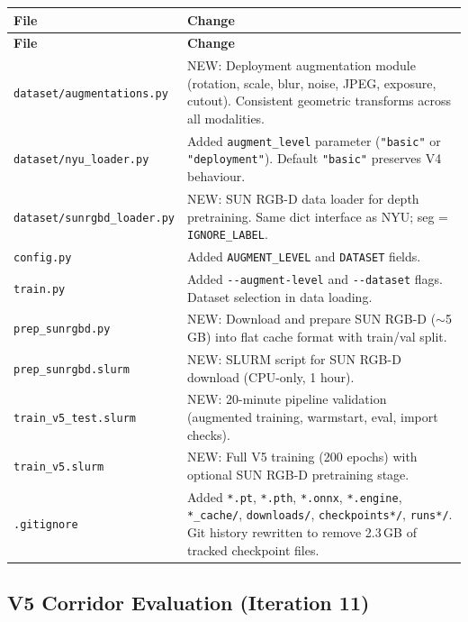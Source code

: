\documentclass[11pt,a4paper]{article}
\begin{document}
\begin{longtable}{lp{8cm}}
\toprule
\textbf{File} & \textbf{Change} \\
\midrule
\endfirsthead
\toprule
\textbf{File} & \textbf{Change} \\
\midrule
\endhead
\texttt{dataset/augmentations.py} & NEW: Deployment augmentation module (rotation, scale, blur, noise, JPEG, exposure, cutout). Consistent geometric transforms across all modalities. \\
\texttt{dataset/nyu\_loader.py}   & Added \texttt{augment\_level} parameter (\texttt{"basic"} or \texttt{"deployment"}). Default \texttt{"basic"} preserves V4 behaviour. \\
\texttt{dataset/sunrgbd\_loader.py} & NEW: SUN RGB-D data loader for depth pretraining. Same dict interface as NYU; seg = \texttt{IGNORE\_LABEL}. \\
\texttt{config.py}               & Added \texttt{AUGMENT\_LEVEL} and \texttt{DATASET} fields. \\
\texttt{train.py}                & Added \texttt{-{}-augment-level} and \texttt{-{}-dataset} flags. Dataset selection in data loading. \\
\texttt{prep\_sunrgbd.py}        & NEW: Download and prepare SUN RGB-D ($\sim$5\,GB) into flat cache format with train/val split. \\
\texttt{prep\_sunrgbd.slurm}     & NEW: SLURM script for SUN RGB-D download (CPU-only, 1 hour). \\
\texttt{train\_v5\_test.slurm}    & NEW: 20-minute pipeline validation (augmented training, warmstart, eval, import checks). \\
\texttt{train\_v5.slurm}         & NEW: Full V5 training (200 epochs) with optional SUN RGB-D pretraining stage. \\
\texttt{.gitignore}              & Added \texttt{*.pt}, \texttt{*.pth}, \texttt{*.onnx}, \texttt{*.engine}, \texttt{*\_cache/}, \texttt{downloads/}, \texttt{checkpoints*/}, \texttt{runs*/}. Git history rewritten to remove 2.3\,GB of tracked checkpoint files. \\
\bottomrule
\end{longtable}

\subsection{V5 Corridor Evaluation (Iteration 11)}
\label{sec:vivek-v5-corridor}
\end{document}
